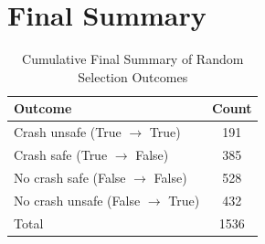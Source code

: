 \documentclass{article}
\begin{document}
\section{Final Summary}

\begin{table}[h]
\centering
\caption{Cumulative Final Summary of Random Selection Outcomes}
\begin{tabular}{lc}
\toprule
Outcome & Count \\
\midrule
Crash unsafe (True $\rightarrow$ True) & 191 \\ 
Crash safe (True $\rightarrow$ False) & 385 \\ 
No crash safe (False $\rightarrow$ False) & 528 \\ 
No crash unsafe (False $\rightarrow$ True) & 432 \\ 
\midrule
Total & 1536 \\ 
\bottomrule
\end{tabular}
\end{table}
\end{document}
